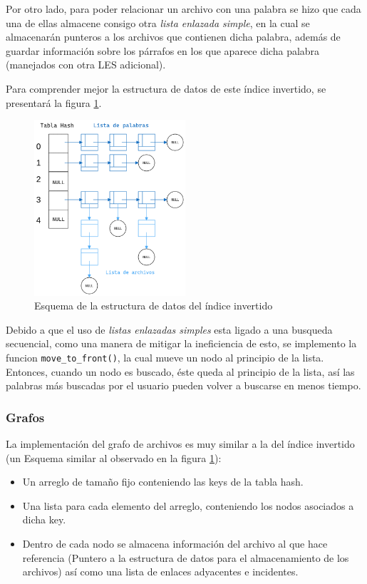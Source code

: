 Por otro lado, para poder relacionar un archivo con una palabra se hizo que cada una de ellas almacene consigo otra \textit{lista enlazada simple}, en la cual se almacenarán punteros a los archivos que contienen dicha palabra, además de guardar información sobre los párrafos en los que aparece dicha palabra (manejados con otra LES adicional).

Para comprender mejor la estructura de datos de este índice invertido, se presentará la figura \ref{fig:reverse_index}.

\begin{figure}[h!]
    \centering
    \includegraphics[width=0.5\textwidth]{src/figures/reverse_index.png}
    \caption{Esquema de la estructura de datos del índice invertido}
    \label{fig:reverse_index}
\end{figure}

Debido a que el uso de \textit{listas enlazadas simples} esta ligado a una busqueda secuencial, como una manera de mitigar la ineficiencia de esto, se implemento la funcion \texttt{move\_to\_front()}, la cual mueve un nodo al principio de la lista. Entonces, cuando un nodo es buscado, éste queda al principio de la lista, así las palabras más buscadas por el usuario pueden volver a buscarse en menos tiempo.


\subsubsection{Grafos}
\label{subsec:ImplGrafos}
La implementación del grafo de archivos es muy similar a la del índice invertido (un Esquema similar al observado en la figura \ref{fig:reverse_index}):
\begin{itemize}
    \item Un arreglo de tamaño fijo conteniendo las keys de la tabla hash.
    \item Una lista para cada elemento del arreglo, conteniendo los nodos asociados a dicha key.
    \item Dentro de cada nodo se almacena información del archivo al que hace referencia (Puntero a la estructura de datos para el almacenamiento de los archivos) así como una lista de enlaces adyacentes e incidentes.
\end{itemize}

